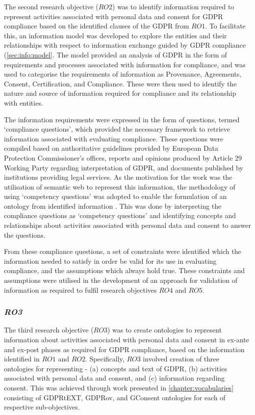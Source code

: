 The second research objective ($RO2$) was to identify information required to represent activities associated with personal data and consent for GDPR compliance based on the identified clauses of the GDPR from $RO1$.
To facilitate this, an information model was developed to explore the entities and their relationships with respect to information exchange guided by GDPR compliance (\autoref{sec:info:model}. The model provided an analysis of GDPR in the form of requirements and processes associated with information for compliance, and was used to categorise the requirements of information as Provenance, Agreements, Consent, Certification, and Compliance. These were then used to identify the nature and source of information required for compliance and its relationship with entities.

The information requirements were expressed in the form of questions, termed `compliance questions', which provided the necessary framework to retrieve information associated with evaluating compliance. 
These questions were compiled based on authoritative guidelines provided by European Data Protection Commissioner's offices, reports and opinions produced by Article 29 Working Party regarding interpretation of GDPR, and documents published by institutions providing legal services.
As the motivation for the work was the utilisation of semantic web to represent this information, the methodology of using `competency questions' was adopted to enable the formulation of an ontology from identified information \cite{noy_ontology_2001}.
This was done by interpreting the compliance questions as `competency questions' and identifying concepts and relationships about activities associated with personal data and consent to answer the questions.

From these compliance questions, a set of constraints were identified which the information needed to satisfy in order be valid for its use in evaluating compliance, and the assumptions which always hold true. These constraints and assumptions were utilised in the development of an approach for validation of information as required to fulfil research objectives $RO4$ and $RO5$.

\subsubsection*{\textit{RO3}}
The third research objective ($RO3$) was to create ontologies to represent information about activities associated with personal data and consent in ex-ante and ex-post phases as required for GDPR compliance, based on the information identified in $RO1$ and $RO2$.
Specifically, $RO3$ involved creation of three ontologies for representing - (a) concepts and text of GDPR, (b) activities associated with personal data and consent, and (c) information regarding consent. This was achieved through work presented in \autoref{chapter:vocabularies} consisting of GDPRtEXT, GDPRov, and GConsent ontologies for each of respective sub-objectives.


